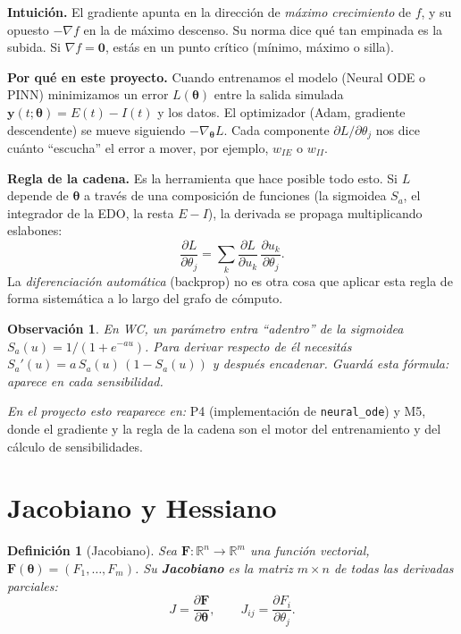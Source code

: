 \documentclass[11pt,a4paper]{article}
\newtheorem{definition}{Definición}
\newtheorem{remark}{Observación}
\newcommand{\R}{\mathbb{R}}
\newcommand{\thetavec}{\bm{\theta}}
\begin{document}
\textbf{Intuición.} El gradiente apunta en la dirección de \emph{máximo crecimiento} de $f$, y su opuesto $-\nabla f$ en la de máximo descenso. Su norma dice qué tan empinada es la subida. Si $\nabla f=\bm 0$, estás en un punto crítico (mínimo, máximo o silla).

\textbf{Por qué en este proyecto.} Cuando entrenamos el modelo (Neural ODE o PINN) minimizamos un error $L(\thetavec)$ entre la salida simulada $\mathbf{y}(t;\thetavec)=E(t)-I(t)$ y los datos. El optimizador (Adam, gradiente descendente) se mueve siguiendo $-\nabla_{\thetavec}L$. Cada componente $\partial L/\partial\theta_j$ nos dice cuánto ``escucha'' el error a mover, por ejemplo, $w_{IE}$ o $w_{II}$.

\textbf{Regla de la cadena.} Es la herramienta que hace posible todo esto. Si $L$ depende de $\thetavec$ a través de una composición de funciones (la sigmoidea $S_a$, el integrador de la EDO, la resta $E-I$), la derivada se propaga multiplicando eslabones:
\[
\frac{\partial L}{\partial\theta_j}=\sum_k \frac{\partial L}{\partial u_k}\,\frac{\partial u_k}{\partial\theta_j}.
\]
La \emph{diferenciación automática} (backprop) no es otra cosa que aplicar esta regla de forma sistemática a lo largo del grafo de cómputo.

\begin{remark}
En WC, un parámetro entra ``adentro'' de la sigmoidea $S_a(u)=1/(1+e^{-au})$. Para derivar respecto de él necesitás $S_a'(u)=a\,S_a(u)\,(1-S_a(u))$ y después encadenar. Guardá esta fórmula: aparece en cada sensibilidad.
\end{remark}

\emph{En el proyecto esto reaparece en:} P4 (implementación de \texttt{neural\_ode}) y M5, donde el gradiente y la regla de la cadena son el motor del entrenamiento y del cálculo de sensibilidades.

\section{Jacobiano y Hessiano}

\begin{definition}[Jacobiano]
Sea $\mathbf{F}:\R^n\to\R^m$ una función \emph{vectorial}, $\mathbf{F}(\thetavec)=(F_1,\dots,F_m)$. Su \textbf{Jacobiano} es la matriz $m\times n$ de todas las derivadas parciales:
\[
J=\frac{\partial\mathbf{F}}{\partial\thetavec},\qquad J_{ij}=\frac{\partial F_i}{\partial\theta_j}.
\]
\end{definition}
\end{document}

